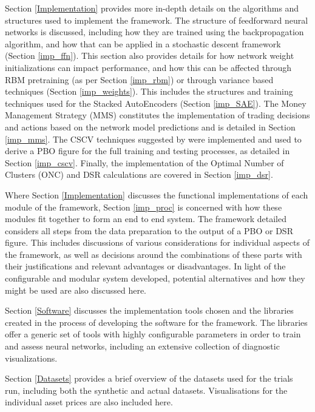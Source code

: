 \documentclass[a4paper,11pt,oneside]{article}
\theoremstyle{plain}
\theoremstyle{definition}
\begin{document}
	Section \ref{Implementation} provides more in-depth details on the algorithms and structures used to implement the framework. The structure of feedforward neural networks is discussed, including how they are trained using the backpropagation algorithm, and how that can be applied in a stochastic descent framework (Section \ref{imp_ffn}). This section also provides details for how network weight initializations can impact performance, and how this can be affected through RBM pretraining (as per Section \ref{imp_rbm}) or through variance based techniques (Section \ref{imp_weights}). This includes the structures and training techniques used for the Stacked AutoEncoders (Section \ref{imp_SAE}). The Money Management Strategy (MMS) constitutes the implementation of trading decisions and actions based on the network model predictions and is detailed in Section \ref{imp_mms}. The CSCV techniques suggested by \citet{BailyPBO} were implemented and used to derive a PBO figure for the full training and testing processes, as detailed in Section \ref{imp_cscv}. Finally, the implementation of the Optimal Number of Clusters (ONC) and DSR calculations are covered in Section \ref{imp_dsr}.\newline

	Where Section \ref{Implementation} discusses the functional implementations of each module of the framework, Section \ref{imp_proc} is concerned with how these modules fit together to form an end to end system. The framework detailed considers all steps from the data preparation to the output of a PBO or DSR figure. This includes discussions of various considerations for individual aspects of the framework, as well as decisions around the combinations of these parts with their justifications and relevant advantages or disadvantages. In light of the configurable and modular system developed, potential alternatives and how they might be used are also discussed here.\newline

	Section \ref{Software} discusses the implementation tools chosen and the libraries created in the process of developing the software for the framework. The libraries offer a generic set of tools with highly configurable parameters in order to train and assess neural networks, including an extensive collection of diagnostic visualizations.\newline

	Section \ref{Datasets} provides a brief overview of the datasets used for the trials run, including both the synthetic and actual datasets. Visualisations for the individual asset prices are also included here.\newline
\end{document}

